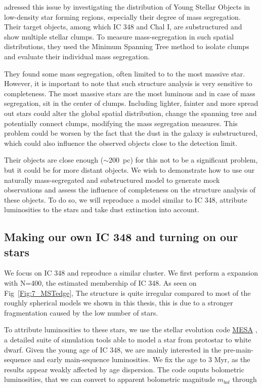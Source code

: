 \cite{Kirk2011} adressed this issue by investigating the distribution of Young Stellar Objects in low-density star forming regions, especially their degree of mass segregation. Their target objects, among which IC 348 and Chal I, are substructured and show multiple stellar clumps. To measure mass-segregation in such spatial distributions, they used the Minimum Spanning Tree method to isolate clumps and evaluate their individual mass segregation.

They found some mass segregation, often limited to to the most massive star. However, it is important to note that such structure analysis is very  sensitive to completeness. The most massive stars are the most luminous and in case of mass segregation, sit in the center of clumps. Including lighter, fainter and more spread out stars could alter the global spatial distribution, change the spanning tree and potentially connect clumps, modifying the mass segregation measures. This problem could be worsen by the fact that the dust in the galaxy is substructured, which could also influence the observed objects close to the detection limit.

Their objects are close enough ($\sim$200~pc) for this not to be a significant problem, but it could be for more distant objects. We wish to  demonstrate how to use our naturally mass-segregated and substructured model to generate mock observations and assess the influence of completeness on the structure analysis of these objects. To do so, we will reproduce a model similar to IC 348, attribute luminosities to the stars and take dust extinction into account.


\subsection*{Making our own IC 348 and turning on our stars}


We focus on IC 348 and reproduce a similar cluster. We first perform a \HubLem expansion with N=400, the estimated membership of IC 348. As seen on Fig~\ref{Fig:7_MSTedge}, The structure is quite irregular compared to most of the roughly spherical models we shown in this thesis, this is due to a stronger fragmentation caused by the low number of stars.

To attribute luminosities to these stars, we use the stellar evolution code \href{http://mesa.sourceforge.net/}{MESA} \citep{Paxton2011}, a detailed suite of simulation tools able to model a star from protostar to white dwarf. Given the young age of IC 348, we are mainly interested in the pre-main-sequence and early main-sequence luminosities. We fix the age to 3 Myr, as the results appear weakly affected by age dispersion. The code ouputs bolometric luminosities, that we can convert to apparent bolometric magnitude $m_{bol}$ through


